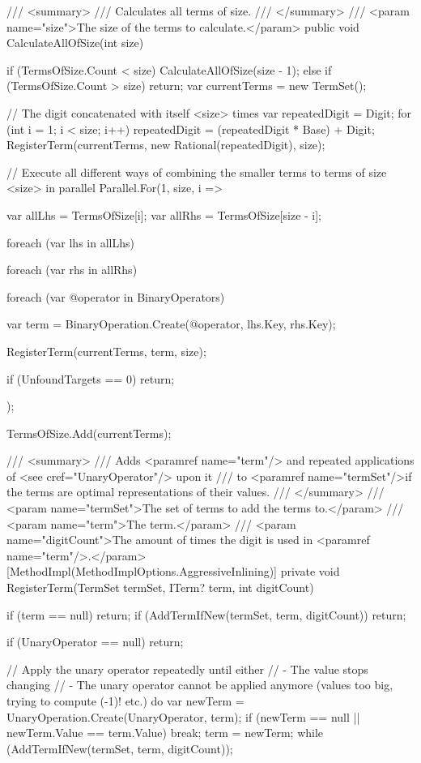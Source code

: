 \documentclass{article}
\theoremstyle{nonumberplain}
\begin{document}
\begin{lstcs}[]
{    /// <summary>
    /// Calculates all terms of size.
    /// </summary>
    /// <param name="size">The size of the terms to calculate.</param>
    public void CalculateAllOfSize(int size)
    {
        if (TermsOfSize.Count < size) CalculateAllOfSize(size - 1);
        else if (TermsOfSize.Count > size) return;
        var currentTerms = new TermSet();

        // The digit concatenated with itself <size> times
        var repeatedDigit = Digit;
        for (int i = 1; i < size; i++) repeatedDigit = (repeatedDigit * Base) + Digit;
        RegisterTerm(currentTerms, new Rational(repeatedDigit), size);

        // Execute all different ways of combining the smaller terms to terms of size <size> in parallel
        Parallel.For(1, size, i =>
        {
            var allLhs = TermsOfSize[i];
            var allRhs = TermsOfSize[size - i];

            foreach (var lhs in allLhs)
            {
                foreach (var rhs in allRhs)
                {
                    foreach (var @operator in BinaryOperators)
                    {
                        var term = BinaryOperation.Create(@operator, lhs.Key, rhs.Key);

                        RegisterTerm(currentTerms, term, size);

                        if (UnfoundTargets == 0) return;
                    }
                }
            }
        });

        TermsOfSize.Add(currentTerms);
    }

    /// <summary>
    /// Adds <paramref name="term"/> and repeated applications of <see cref="UnaryOperator"/> upon it
    /// to <paramref name="termSet"/>if the terms are optimal representations of their values.
    /// </summary>
    /// <param name="termSet">The set of terms to add the terms to.</param>
    /// <param name="term">The term.</param>
    /// <param name="digitCount">The amount of times the digit is used in <paramref name="term"/>.</param>
    [MethodImpl(MethodImplOptions.AggressiveInlining)]
    private void RegisterTerm(TermSet termSet, ITerm? term, int digitCount)
    {
        if (term == null) return;
        if (AddTermIfNew(termSet, term, digitCount)) return;

        if (UnaryOperator == null) return;

        // Apply the unary operator repeatedly until either
        //  - The value stops changing
        //  - The unary operator cannot be applied anymore (values too big, trying to compute (-1)! etc.)
        do
        {
            var newTerm = UnaryOperation.Create(UnaryOperator, term);
            if (newTerm == null || newTerm.Value == term.Value) break;
            term = newTerm;
        }
        while (AddTermIfNew(termSet, term, digitCount));
    }

}
\end{lstcs}
\end{document}
